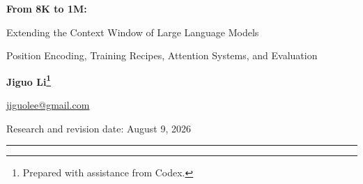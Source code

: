 \documentclass[UTF8,10pt,a4paper,fontset=none]{ctexart}
\begin{document}
\markboth{}{}
\begin{center}
  {\fontsize{24}{29}\selectfont\bfseries\sffamily\color{navy}From 8K to 1M:\par Extending the Context Window of Large Language Models\par}
  \vspace{5pt}
  {\Large\sffamily\color{navy}Position Encoding, Training Recipes, Attention Systems, and Evaluation\par}
  \vspace{8pt}
  {\normalsize\textbf{Jiguo Li\footnote{Prepared with assistance from Codex.}}}\par
  \vspace{2pt}
  {\small\href{mailto:jiguolee@gmail.com}{jiguolee@gmail.com}}\par
  \vspace{4pt}
  {\small Research and revision date: August 9, 2026}\par
\end{center}
\vspace{5pt}
{\color{navy}\hrule height 0.6pt}
\vspace{7pt}

\begin{abstract}
A reliable long-context language model cannot be obtained by merely increasing a configuration value. Four conditions must hold simultaneously: positional representations must remain numerically stable beyond the training length; the model must learn to retrieve, integrate, and reason over distant evidence; attention computation, KV-cache management, communication, and scheduling must remain affordable; and evaluation must distinguish an accepted input from context that the model can actually use. This report develops a unified account of absolute and relative positions, RoPE, ALiBi, positional interpolation, NTK-aware scaling, YaRN, and LongRoPE. It then explains the engineering progression from 8K to 16K, 32K, 256K, and 1M tokens; connects the algorithms to Hugging Face Transformers, Megatron Core, FlashAttention, context parallelism, and modern serving systems; and provides concrete recipes for continued pre-training, long-context instruction tuning, data construction, and evaluation. Recent developments in native sparse attention, hybrid linear attention, DeepSeek Sparse Attention, Kimi Linear, and million-token multimodal and agent models are used to identify the next research frontier. The central claim is that positional extension supplies a coordinate system, long-sequence training creates usable capability, and systems optimization makes that capability deployable.
\end{abstract}
\end{document}

